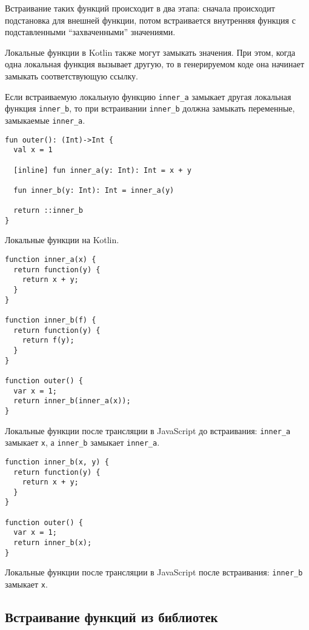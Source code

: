 Встраивание таких функций происходит в два этапа:
сначала происходит подстановка для внешней функции,
потом встраивается внутренняя функция с подставленными
``захваченными'' значениями.

Локальные функции в Kotlin также могут замыкать значения.
При этом, когда одна локальная функция вызывает другую,
то в генерируемом коде она начинает замыкать
соответствующую ссылку.

Если встраиваемую локальную функцию \texttt{inner\_a}
замыкает другая локальная функция \texttt{inner\_b},
то при встраивании \texttt{inner\_b} должна замыкать
переменные, замыкаемые \texttt{inner\_a}.

\begin{listing}[H]
\begin{verbatim}
fun outer(): (Int)->Int {
  val x = 1

  [inline] fun inner_a(y: Int): Int = x + y

  fun inner_b(y: Int): Int = inner_a(y)

  return ::inner_b
}
\end{verbatim}
\caption{Локальные функции на Kotlin.}
\end{listing}

\begin{listing}[H]
\begin{verbatim}
function inner_a(x) {
  return function(y) {
    return x + y;
  }
}

function inner_b(f) {
  return function(y) {
    return f(y);
  }
}

function outer() {
  var x = 1;
  return inner_b(inner_a(x));
}
\end{verbatim}
\caption{Локальные функции после трансляции в JavaScript до встраивания:
\texttt{inner\_a} замыкает \texttt{x}, а \texttt{inner\_b} замыкает \texttt{inner\_a}.}
\end{listing}

\begin{listing}[H]
\begin{verbatim}
function inner_b(x, y) {
  return function(y) {
    return x + y;
  }
}

function outer() {
  var x = 1;
  return inner_b(x);
}
\end{verbatim}
\caption{Локальные функции после трансляции в JavaScript после встраивания:
\texttt{inner\_b} замыкает \texttt{x}.}
\end{listing}

\subsection{Встраивание функций из библиотек}

